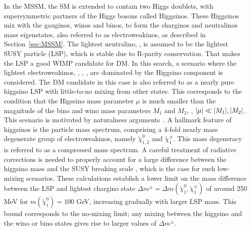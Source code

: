 In the MSSM, the SM is extended to contain two Higgs doublets, with supersymmetric partners of the Higgs bosons called Higgsinos. These Higgsinos mix with the gauginos, winos and binos, to form the charginos and neutralinos mass eigenstates, also referred to as electroweakinos, as described in Section~\ref{sec:MSSM}. The lightest neutralino, \PSGczDo, is assumed to be the lightest SUSY particle (LSP), which is stable due to R-parity conservation. That makes the LSP a good WIMP candidate for DM. In this search, a scenario where the lightest electroweakinos, \PSGczDt, \PSGcpmDo, \PSGczDo, are dominated by the Higgsino component is considered. The DM candidate in this case is also referred to as a nearly pure higgsino LSP with little-to-no mixing from other states. This corresponds to the condition that the Higssino mass parameter $\mu$ is much smaller than the magnitude of the bino and wino mass parameters $M_1$ and $M_2$, \ie, $\abs{\mu}\ll \abs{M_1},\abs{M_2}$. This scenario is motivated by naturalness arguments~\cite{BARBIERI198863,de_Carlos_1993}. A hallmark feature of higgsinos is the particle mass spectrum, comprising a 4-fold nearly mass degenerate group of electroweakinos, namely $\tilde{\chi}_{1,2}^{0}$ and $\tilde{\chi}_{1}^{\pm}$. This mass degeneracy is referred to as a compressed mass spectrum. A careful treatment of radiative corrections is needed to properly account for a large difference between the higgsino mass and the SUSY breaking scale \cite{Nagata_2015}, which is the case for such low-mixing scenarios. These calculations establish a lower limit on the mass difference between the LSP and lightest chargino state $\Delta m^{\pm}=\Delta m(\tilde{\chi}_{1}^{0},\tilde{\chi}_{1}^{\pm})$ of around 250 MeV for $m(\tilde{\chi}_{1}^{0})=100$ GeV, increasing gradually with larger LSP mass. This bound corresponds to the no-mixing limit; any mixing between the higgsino and the wino or bino states gives rise to larger values of $\Delta m^{\pm}$. 

